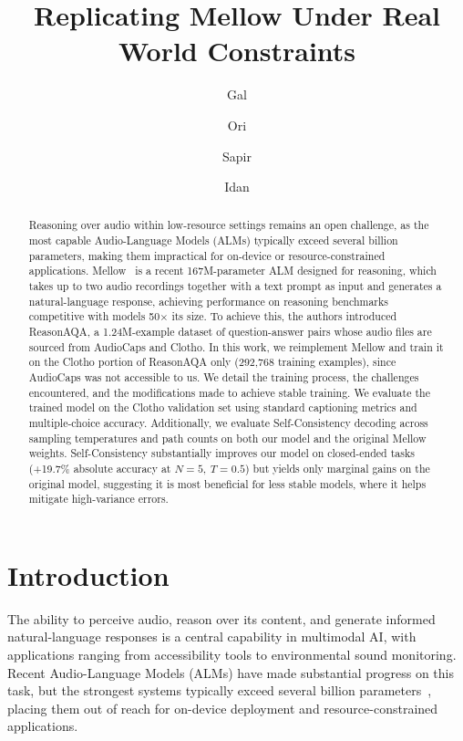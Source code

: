 \documentclass[cameraready]{Interspeech}
\title{Replicating Mellow Under Real World Constraints}
\author[affiliation={1}]{Gal}{Aharoni}
\author[affiliation={1}]{Ori}{Baron}
\author[affiliation={1}]{Sapir}{Talmi}
\author[affiliation={1}]{Idan}{Tarshish}
\begin{document}
\maketitle


\begin{abstract}
    Reasoning over audio within low-resource settings remains an open challenge, as the most capable Audio-Language Models (ALMs) typically exceed several billion parameters, making them impractical for on-device or resource-constrained applications. Mellow~\cite{mellow} is a recent 167M-parameter ALM designed for reasoning, which takes up to two audio recordings together with a text prompt as input and generates a natural-language response, achieving performance on reasoning benchmarks competitive with models 50$\times$ its size. To achieve this, the authors introduced ReasonAQA, a 1.24M-example dataset of question-answer pairs whose audio files are sourced from AudioCaps and Clotho. In this work, we reimplement Mellow and train it on the Clotho portion of ReasonAQA only (292,768 training examples), since AudioCaps was not accessible to us. We detail the training process, the challenges encountered, and the modifications made to achieve stable training. We evaluate the trained model on the Clotho validation set using standard captioning metrics and multiple-choice accuracy. Additionally, we evaluate Self-Consistency decoding across sampling temperatures and path counts on both our model and the original Mellow weights. Self-Consistency substantially improves our model on closed-ended tasks (+19.7\% absolute accuracy at $N{=}5,\ T{=}0.5$) but yields only marginal gains on the original model, suggesting it is most beneficial for less stable models, where it helps mitigate high-variance errors.

\end{abstract}



\section{Introduction}
\label{sec:intro}

The ability to perceive audio, reason over its content, and generate informed natural-language responses is a central capability in multimodal AI, with applications ranging from accessibility tools to environmental sound monitoring. Recent Audio-Language Models (ALMs) have made substantial progress on this task, but the strongest systems typically exceed several billion parameters~\cite{tang2024salmonn, gong2024listen, chu2024qwen2audio}, placing them out of reach for on-device deployment and resource-constrained applications.
\end{document}
